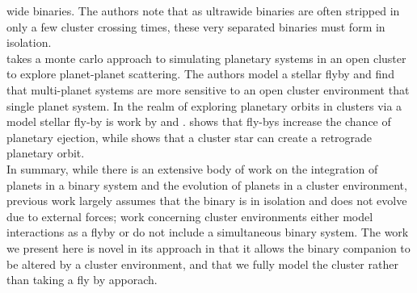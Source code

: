 \documentclass{aastex631}
\begin{document}
  wide binaries. The authors note that as ultrawide binaries are often stripped in only a few cluster crossing times, these very separated binaries must form in isolation. \\
  \indent \cite{hao13} takes a monte carlo approach to simulating planetary systems in an
 open cluster to explore planet-planet scattering. The authors model a stellar flyby and find that multi-planet systems are more sensitive to an open cluster 
 environment that single planet system. In the realm of exploring planetary orbits in clusters via a model stellar fly-by is work by \cite{mal11} and \cite{bre19}.
  \cite{mal11} shows that fly-bys increase the chance of planetary ejection, while \cite{bre19} shows that a cluster
star can create a retrograde planetary orbit.  \\

\indent In summary, while there is an extensive body of work on the integration of planets in a binary system and the evolution of planets in a cluster environment, previous work
largely assumes that the binary is in isolation and does not evolve due to external forces; work concerning cluster environments either model interactions as a flyby 
or do not include a simultaneous binary system. The work we present here is novel in its approach in that it allows the binary companion to be altered by a cluster environment,
and that we fully model the cluster rather than taking a fly by apporach. 
\end{document}
